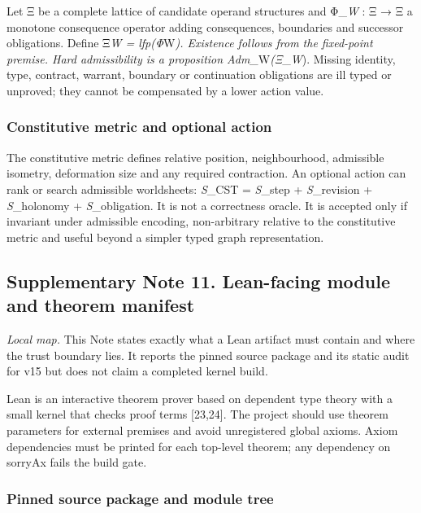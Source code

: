 Let Ξ be a complete lattice of candidate operand structures and
Φ\_\emph{W} : Ξ → Ξ a monotone consequence operator adding consequences,
boundaries and successor obligations. Define Ξ\emph{\emph{\emph{W} =
lfp(Φ}}W\emph{). Existence follows from the fixed-point premise. Hard
admissibility is a proposition Adm\_}W\emph{(Ξ}\_\emph{W}). Missing
identity, type, contract, warrant, boundary or continuation obligations
are ill typed or unproved; they cannot be compensated by a lower action
value.

\hypertarget{constitutive-metric-and-optional-action}{%
\subsubsection{Constitutive metric and optional
action}\label{constitutive-metric-and-optional-action}}

The constitutive metric defines relative position, neighbourhood,
admissible isometry, deformation size and any required contraction. An
optional action can rank or search admissible worldsheets: \emph{S}\_CST
= \emph{S}\_step + \emph{S}\_revision + \emph{S}\_holonomy +
\emph{S}\_obligation. It is not a correctness oracle. It is accepted
only if invariant under admissible encoding, non-arbitrary relative to
the constitutive metric and useful beyond a simpler typed graph
representation.

\hypertarget{supplementary-note-11.-lean-facing-module-and-theorem-manifest}{%
\subsection{Supplementary Note 11. Lean-facing module and theorem
manifest}\label{supplementary-note-11.-lean-facing-module-and-theorem-manifest}}

\emph{Local map.} This Note states exactly what a Lean artifact must
contain and where the trust boundary lies. It reports the pinned source
package and its static audit for v15 but does not claim a completed
kernel build.

Lean is an interactive theorem prover based on dependent type theory
with a small kernel that checks proof terms {[}23,24{]}. The project
should use theorem parameters for external premises and avoid
unregistered global axioms. Axiom dependencies must be printed for each
top-level theorem; any dependency on sorryAx fails the build gate.

\hypertarget{pinned-source-package-and-module-tree}{%
\subsubsection{Pinned source package and module
tree}\label{pinned-source-package-and-module-tree}}

